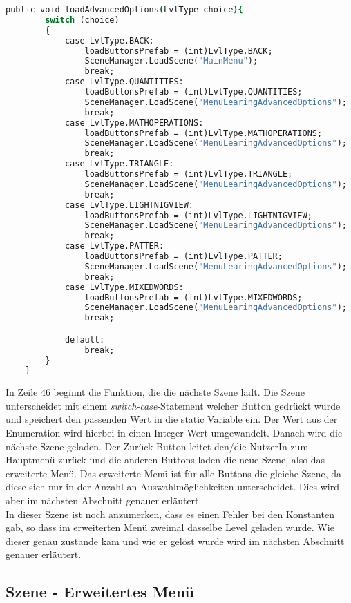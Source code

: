 \begin{lstlisting}[language=csh, caption={MenuPickLevel.cs Klasse Menü loadAdvancedOptions- Funktion}]
	public void loadAdvancedOptions(LvlType choice){
		switch (choice)
		{
			case LvlType.BACK:
				loadButtonsPrefab = (int)LvlType.BACK;
				SceneManager.LoadScene("MainMenu");
				break;
			case LvlType.QUANTITIES:
				loadButtonsPrefab = (int)LvlType.QUANTITIES;
				SceneManager.LoadScene("MenuLearingAdvancedOptions");
				break;
			case LvlType.MATHOPERATIONS:
				loadButtonsPrefab = (int)LvlType.MATHOPERATIONS;
				SceneManager.LoadScene("MenuLearingAdvancedOptions");
				break;
			case LvlType.TRIANGLE:
				loadButtonsPrefab = (int)LvlType.TRIANGLE;
				SceneManager.LoadScene("MenuLearingAdvancedOptions");
				break;
			case LvlType.LIGHTNIGVIEW:
				loadButtonsPrefab = (int)LvlType.LIGHTNIGVIEW;
				SceneManager.LoadScene("MenuLearingAdvancedOptions");
				break;
			case LvlType.PATTER:
				loadButtonsPrefab = (int)LvlType.PATTER;
				SceneManager.LoadScene("MenuLearingAdvancedOptions");
				break;
			case LvlType.MIXEDWORDS:
				loadButtonsPrefab = (int)LvlType.MIXEDWORDS;
				SceneManager.LoadScene("MenuLearingAdvancedOptions");
				break;

			default:
				break;
		}
	}
\end{lstlisting}

In Zeile 46 beginnt die Funktion, die die nächste Szene lädt. Die Szene unterscheidet mit einem \textit{switch-case}-Statement welcher Button gedrückt wurde und speichert den passenden Wert in die static Variable ein. Der Wert aus der Enumeration wird hierbei in einen Integer Wert umgewandelt. Danach wird die nächste Szene geladen. Der Zurück-Button leitet den/die NutzerIn zum Hauptmenü zurück und die anderen Buttons laden die neue Szene, also das erweiterte Menü. Das erweiterte Menü ist für alle Buttons die gleiche Szene, da diese sich nur in der Anzahl an Auswahlmöglichkeiten unterscheidet. Dies wird aber im nächsten Abschnitt genauer erläutert.\\
In dieser Szene ist noch anzumerken, dass es einen Fehler bei den Konstanten gab, so dass im erweiterten Menü zweimal dasselbe Level geladen wurde. Wie dieser genau zustande kam und wie er gelöst wurde wird im nächsten Abschnitt genauer erläutert.

\subsection{Szene - Erweitertes Menü}
